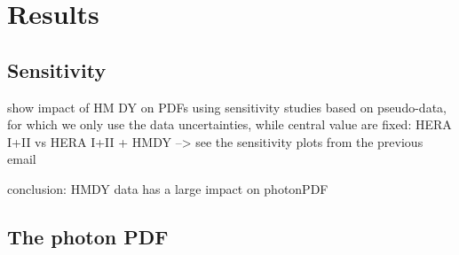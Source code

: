 \section{Results}
\label{sec:results}

\subsection{Sensitivity}
 show impact of HM DY on PDFs using sensitivity studies based on
pseudo-data, for which we only use the data uncertainties, while central 
value are fixed:
 HERA I+II vs HERA I+II + HMDY --> see the sensitivity plots from the previous email

conclusion: HMDY data has a large impact on photonPDF 

\subsection{The photon PDF}

